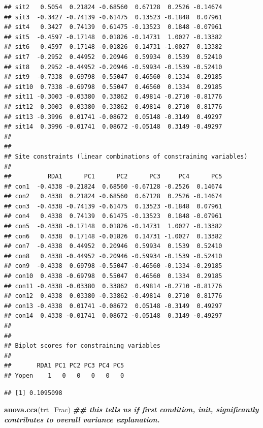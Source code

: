 \documentclass[
]{article}
\newenvironment{Shaded}{\begin{snugshade}}{\end{snugshade}}
\newcommand{\CommentTok}[1]{\textcolor[rgb]{0.56,0.35,0.01}{\textit{#1}}}
\newcommand{\DocumentationTok}[1]{\textcolor[rgb]{0.56,0.35,0.01}{\textbf{\textit{#1}}}}
\newcommand{\FunctionTok}[1]{\textcolor[rgb]{0.13,0.29,0.53}{\textbf{#1}}}
\newcommand{\NormalTok}[1]{#1}
\newcommand{\SpecialCharTok}[1]{\textcolor[rgb]{0.81,0.36,0.00}{\textbf{#1}}}
\begin{document}
\begin{verbatim}
## sit2   0.5054  0.21824 -0.68560  0.67128  0.2526 -0.14674
## sit3  -0.3427 -0.74139 -0.61475  0.13523 -0.1848  0.07961
## sit4   0.3427  0.74139  0.61475 -0.13523  0.1848 -0.07961
## sit5  -0.4597 -0.17148  0.01826 -0.14731  1.0027 -0.13382
## sit6   0.4597  0.17148 -0.01826  0.14731 -1.0027  0.13382
## sit7  -0.2952  0.44952  0.20946  0.59934  0.1539  0.52410
## sit8   0.2952 -0.44952 -0.20946 -0.59934 -0.1539 -0.52410
## sit9  -0.7338  0.69798 -0.55047 -0.46560 -0.1334 -0.29185
## sit10  0.7338 -0.69798  0.55047  0.46560  0.1334  0.29185
## sit11 -0.3003 -0.03380  0.33862  0.49814 -0.2710 -0.81776
## sit12  0.3003  0.03380 -0.33862 -0.49814  0.2710  0.81776
## sit13 -0.3996  0.01741 -0.08672  0.05148 -0.3149  0.49297
## sit14  0.3996 -0.01741  0.08672 -0.05148  0.3149 -0.49297
## 
## 
## Site constraints (linear combinations of constraining variables)
## 
##          RDA1      PC1      PC2      PC3     PC4      PC5
## con1  -0.4338 -0.21824  0.68560 -0.67128 -0.2526  0.14674
## con2   0.4338  0.21824 -0.68560  0.67128  0.2526 -0.14674
## con3  -0.4338 -0.74139 -0.61475  0.13523 -0.1848  0.07961
## con4   0.4338  0.74139  0.61475 -0.13523  0.1848 -0.07961
## con5  -0.4338 -0.17148  0.01826 -0.14731  1.0027 -0.13382
## con6   0.4338  0.17148 -0.01826  0.14731 -1.0027  0.13382
## con7  -0.4338  0.44952  0.20946  0.59934  0.1539  0.52410
## con8   0.4338 -0.44952 -0.20946 -0.59934 -0.1539 -0.52410
## con9  -0.4338  0.69798 -0.55047 -0.46560 -0.1334 -0.29185
## con10  0.4338 -0.69798  0.55047  0.46560  0.1334  0.29185
## con11 -0.4338 -0.03380  0.33862  0.49814 -0.2710 -0.81776
## con12  0.4338  0.03380 -0.33862 -0.49814  0.2710  0.81776
## con13 -0.4338  0.01741 -0.08672  0.05148 -0.3149  0.49297
## con14  0.4338 -0.01741  0.08672 -0.05148  0.3149 -0.49297
## 
## 
## Biplot scores for constraining variables
## 
##       RDA1 PC1 PC2 PC3 PC4 PC5
## Yopen    1   0   0   0   0   0
\end{verbatim}

\begin{Shaded}
\end{Shaded}

\begin{verbatim}
## [1] 0.1095098
\end{verbatim}

\begin{Shaded}
\begin{Highlighting}[]
\FunctionTok{anova.cca}\NormalTok{(trt\_Frac) }\DocumentationTok{\#\# this tells us if first condition, init, significantly contributes to overall variance explanation. }
\end{Highlighting}
\end{Shaded}
\end{document}
